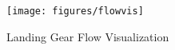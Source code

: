 \begin{figure}
	\begin{center}
		\centerline{\texttt{[image: figures/flowvis]}}
		\caption{Landing Gear Flow Visualization}
		\label{fig:flowvis}
	\end{center}
\end{figure}




%


